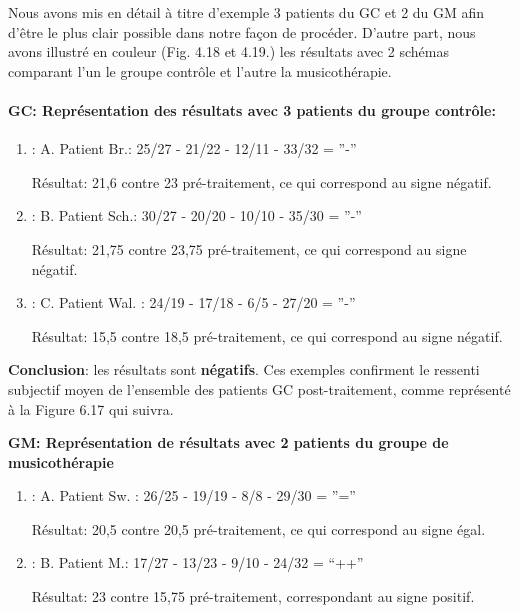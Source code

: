 Nous avons mis en détail  à titre d'exemple 3 patients du GC et 2 du GM
afin d'être le plus clair possible
dans notre façon de procéder.
D'autre part, nous avons illustré en couleur (Fig. 4.18 et 4.19.) les
résultats avec 2 schémas
comparant l'un le groupe contrôle et l'autre la musicothérapie.

\paragraph{ GC: Représentation des résultats avec 3 patients du groupe contrôle:}

\begin{enumerate}
\item : A. Patient Br.:  25/27 - 21/22 - 12/11 - 33/32 =  ''-''
  
          Résultat: 21,6 contre 23 pré-traitement,  ce qui
        correspond au signe négatif.
      \item : B. Patient Sch.: 30/27 - 20/20 -  10/10 - 35/30 = ''-''
        
         Résultat: 21,75 contre 23,75 pré-traitement, ce qui
        correspond au signe négatif.
              
 		\item :  C. Patient Wal. : 24/19 -  17/18 - 6/5 -
                  27/20 =  ''-''

                  Résultat: 15,5 contre 18,5 pré-traitement, ce qui
        correspond au signe négatif.
 	\end{enumerate}
        

       \textbf{ Conclusion}: les résultats sont \textbf{négatifs}.
        Ces exemples confirment  
        le ressenti subjectif moyen de l'ensemble des patients
        GC post-traitement, comme représenté à la Figure 6.17
        qui suivra.

       \textbf{ GM: Représentation de résultats avec 2 patients du groupe de musicothérapie}

\begin{enumerate}
 		\item : A. Patient Sw. : 26/25 - 19/19 - 8/8 - 29/30 =  ''='' 
                
                
                
  Résultat: 20,5 contre 20,5 pré-traitement, ce qui
        correspond au signe égal.



 		\item : B. Patient M.: 17/27 - 13/23 -  9/10 - 24/32 = ``++''
 	
              Résultat: 23 contre 15,75 pré-traitement, correspondant
              au signe positif. 
            \end{enumerate}
            
